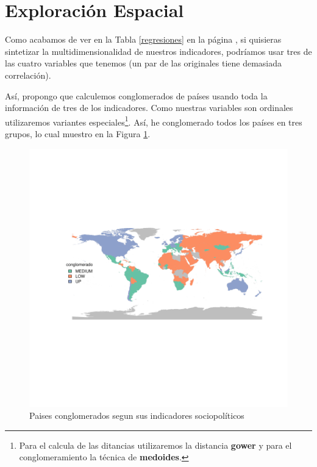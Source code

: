\clearpage

\section{Exploración Espacial}

Como acabamos de ver en la Tabla \ref{regresiones} en la página \pageref{regresiones}, si quisieras sintetizar la multidimensionalidad de nuestros indicadores, podríamos usar tres de las cuatro variables que tenemos (un par de las originales tiene demasiada correlación). 

Así, propongo que calculemos conglomerados de países usando toda la información de tres de los indicadores. Como nuestras variables son ordinales utilizaremos variantes especiales\footnote{Para el calcula de las ditancias utilizaremos la distancia {\bf gower} y para el conglomeramiento la técnica de {\bf medoides}.}. Así, he conglomerado todos los países en tres grupos, lo cual muestro en la Figura \ref{clustmap}.






\begin{figure}[h]
\centering
\begin{adjustbox}{width=11cm,height=8cm,clip,trim=1cm 2.5cm 0cm 2.5cm}
\includegraphics{paperVersion_7_regresion-plotMap1}
\end{adjustbox}
\caption{Paises conglomerados segun sus indicadores sociopolíticos}\label{clustmap}
\end{figure}



\endinput
